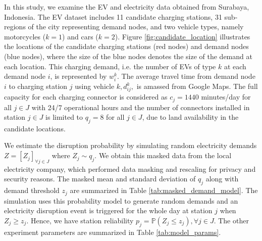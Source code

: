 \documentclass[preprint]{oscmjournal}
\theoremstyle{remark}
\begin{document}
In this study, we examine the EV and electricity data obtained from Surabaya, Indonesia. The EV dataset includes 11 candidate charging stations, 31 sub-regions of the city representing demand nodes, and two vehicle types, namely motorcycles ($k=1$) and cars ($k=2$). Figure \ref{fig:candidate_location} illustrates the locations of the candidate charging stations (red nodes) and demand nodes (blue nodes), where the size of the blue nodes denotes the size of the demand at each location. This charging demand, i.e. the number of EVs of type $k$ at each demand node $i$, is represented by $w_i^k$. The average travel time from demand node $i$ to charging station $j$ using vehicle $k, d_{ij}^k,$ is amassed from Google Maps.  The full capacity for each charging connector is considered as $c_j=1440$ minutes/day for all $j \in J$ with 24/7 operational hours and the number of connectors installed in station $j \in J$ is limited to $q_j=8$ for all $j \in J$, due to land availability in the candidate locations.

We estimate the disruption probability by simulating random electricity demands $Z = [Z_j]_{\forall j \in J}$ where $Z_j \sim q_j$. We obtain this masked data from the local electricity company, which performed data masking and rescaling for privacy and security reasons. The masked mean and standard deviation of $q_j$ along with demand threshold $z_j$ are summarized in Table \ref{tab:masked_demand_model}. The simulation uses this probability model to generate random demands and an electricity disruption event is triggered for the whole day at station $j$ when $Z_j  \geq z_j$. Hence, we have station reliability $p_j = \mathbb P(Z_j \leq z_j), \forall j \in J$. The other experiment parameters are summarized in Table \ref{tab:model_params}.
\end{document}
